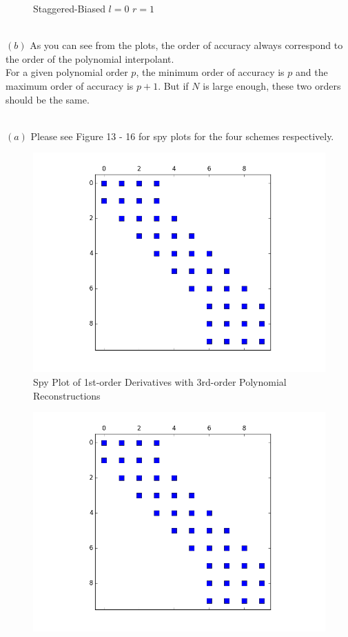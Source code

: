 \documentclass[12pt]{article}
\newenvironment{problem}[2][Problem]{\begin{trivlist}
\item[\hskip \labelsep {\bfseries #1}\hskip \labelsep {\bfseries #2.}]}{\end{trivlist}}
\begin{document}
\begin{problem}{1}
\begin{figure}
 \caption{Staggered-Biased $l = 0$ $r = 1$}
\label{label}
\end{figure}
\\
$(b)$ As you can see from the plots, the order of accuracy  always correspond to the order of the polynomial interpolant.\\
For a given polynomial order $p$, the minimum order of accuracy is $p$ and the maximum order of accuracy is $p+1$. But if $N$ is large enough, these two orders should be the same.\\
\end{problem}

\begin{problem}{2}
\text{ }\\
$(a)$ Please see Figure 13 - 16 for spy plots for the four schemes respectively.
\begin{figure}
\centering
  \includegraphics[scale=0.5]{p2_3p1d}
 \caption{Spy Plot of 1st-order Derivatives with 3rd-order Polynomial Reconstructions }
\label{label}
\end{figure}
\begin{figure}
\centering
  \includegraphics[scale=0.5]{p2_3p3d}

\end{figure}
\end{problem}
\end{document}
